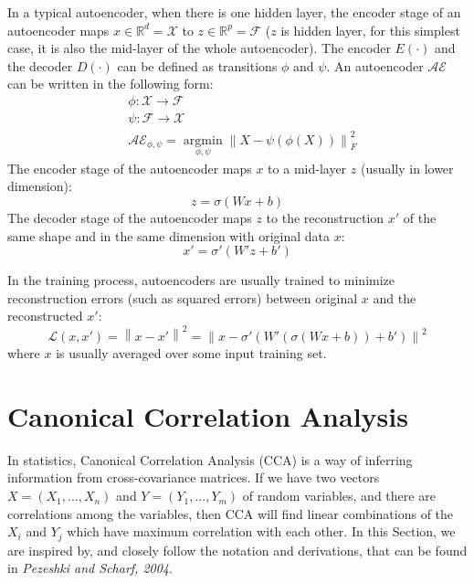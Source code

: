 \documentclass[12pt]{report} %
\newcommand{\norm}[1]{\left\lVert #1 \right\rVert}
\begin{document}
In a typical autoencoder, when there is one hidden layer, the encoder stage of an autoencoder maps \(x\in \mathbb{R}^{d}=\mathcal{X}\) to \(z\in \mathbb{R}^{p}=\mathcal{F}\) ($z$ is hidden layer, for this simplest case, it is also the mid-layer of the whole autoencoder). The encoder \(E(\cdot)\) and the decoder \(D(\cdot)\) can be defined as transitions $\phi$ and $\psi$. An autoencoder $\mathcal{AE}$ can be written in the following form:
\begin{equation}
\begin{split}
& \phi:\mathcal{X}\to\mathcal{F} \\
& \psi:\mathcal{F}\to\mathcal{X} \\
& \mathcal{AE}_{\phi,\psi}=\operatorname*{argmin}_{\phi,\psi} \norm{X-\psi(\phi(X))}^2_F
\end{split}
\end{equation}
The encoder stage of the autoencoder maps $x$ to a mid-layer $z$ (usually in lower dimension):
\begin{equation}
z=\sigma(Wx+b)
\end{equation}
The decoder stage of the autoencoder maps $z$ to the reconstruction $x'$  of the same shape and in the same dimension with original data $x$:
\begin{equation}
x'=\sigma'(W'z+b')
\end{equation}

In the training process, autoencoders are usually trained to minimize reconstruction errors (such as squared errors) between original $x$ and the reconstructed $x'$:
\begin{equation}
\mathcal{L}(x,x')=\norm{x-x'}^2=\norm{x-\sigma'(W'(\sigma(Wx+b))+b')}^2
\end{equation}
where $x$ is usually averaged over some input training set\cite{AE}.

\section{Canonical Correlation Analysis}
In statistics, Canonical Correlation Analysis (CCA) is a way of inferring information from cross-covariance matrices. If we have two vectors \(X = (X_{1}, ..., X_{n})\) and \(Y = (Y_{1}, ..., Y_{m})\) of random variables, and there are correlations among the variables, then CCA will find linear combinations of the $X_{i}$ and $Y_{j}$ which have maximum correlation with each other\cite{CCA}. In this Section, we are inspired by, and closely follow the notation and derivations, that can be found in \textit{Pezeshki and Scharf, 2004}\cite{ECCA}.
\end{document}
